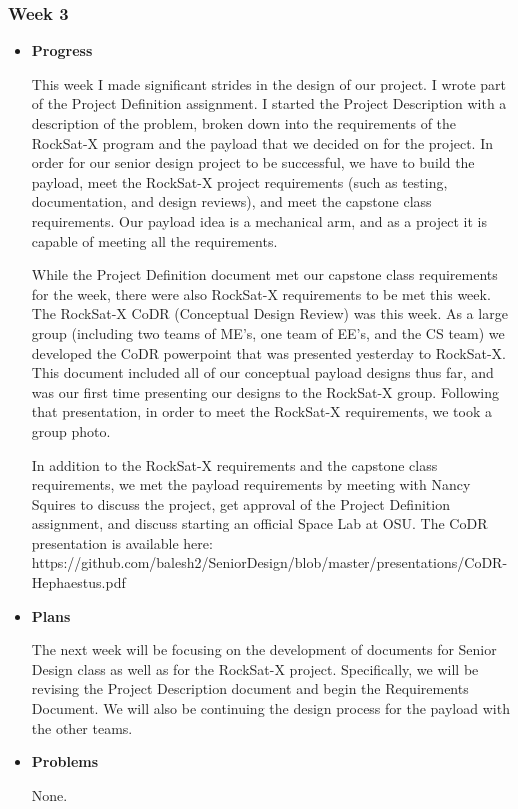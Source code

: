 \subsubsection{Week 3}
\begin{itemize}
\item{
\textbf{Progress}

This week I made significant strides in the design of our project. I wrote part of the Project Definition assignment. I started the Project Description with a description of the problem, broken down into the requirements of the RockSat-X program and the payload that we decided on for the project. In order for our senior design project to be successful, we have to build the payload, meet the RockSat-X project requirements (such as testing, documentation, and design reviews), and meet the capstone class requirements. Our payload idea is a mechanical arm, and as a project it is capable of meeting all the requirements.

While the Project Definition document met our capstone class requirements for the week, there were also RockSat-X requirements to be met this week. The RockSat-X CoDR (Conceptual Design Review) was this week. As a large group (including two teams of ME's, one team of EE's, and the CS team) we developed the CoDR powerpoint that was presented yesterday to RockSat-X. This document included all of our conceptual payload designs thus far, and was our first time presenting our designs to the RockSat-X group. Following that presentation, in order to meet the RockSat-X requirements, we took a group photo.

In addition to the RockSat-X requirements and the capstone class requirements, we met the payload requirements by meeting with Nancy Squires to discuss the project, get approval of the Project Definition assignment, and discuss starting an official Space Lab at OSU. The CoDR presentation is available here: https://github.com/balesh2/SeniorDesign/blob/master/presentations/CoDR-Hephaestus.pdf
}

\item{
\textbf{Plans}

The next week will be focusing on the development of documents for Senior Design class as well as for the RockSat-X project. Specifically, we will be revising the Project Description document and begin the Requirements Document. We will also be continuing the design process for the payload with the other teams.
}

\item{
\textbf{Problems}

None.
}
\end{itemize}

